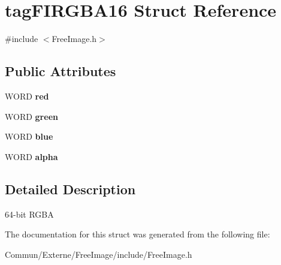 \hypertarget{structtag_f_i_r_g_b_a16}{}\section{tag\+F\+I\+R\+G\+B\+A16 Struct Reference}
\label{structtag_f_i_r_g_b_a16}


{\ttfamily \#include $<$Free\+Image.\+h$>$}

\subsection*{Public Attributes}
\begin{DoxyCompactItemize}
\item 
W\+O\+RD {\bfseries red}\hypertarget{structtag_f_i_r_g_b_a16_a580143c8b2f5e28721972342a6facd01}{}\label{structtag_f_i_r_g_b_a16_a580143c8b2f5e28721972342a6facd01}

\item 
W\+O\+RD {\bfseries green}\hypertarget{structtag_f_i_r_g_b_a16_a0ae72ef6b7fe786b9ea6068579cd3f2d}{}\label{structtag_f_i_r_g_b_a16_a0ae72ef6b7fe786b9ea6068579cd3f2d}

\item 
W\+O\+RD {\bfseries blue}\hypertarget{structtag_f_i_r_g_b_a16_afe4aa863b00988ad24831a1432ef837e}{}\label{structtag_f_i_r_g_b_a16_afe4aa863b00988ad24831a1432ef837e}

\item 
W\+O\+RD {\bfseries alpha}\hypertarget{structtag_f_i_r_g_b_a16_a9875250254b19efbfb321bf33ae2fdf6}{}\label{structtag_f_i_r_g_b_a16_a9875250254b19efbfb321bf33ae2fdf6}

\end{DoxyCompactItemize}


\subsection{Detailed Description}
64-\/bit R\+G\+BA 

The documentation for this struct was generated from the following file\+:\begin{DoxyCompactItemize}
\item 
Commun/\+Externe/\+Free\+Image/include/Free\+Image.\+h\end{DoxyCompactItemize}
